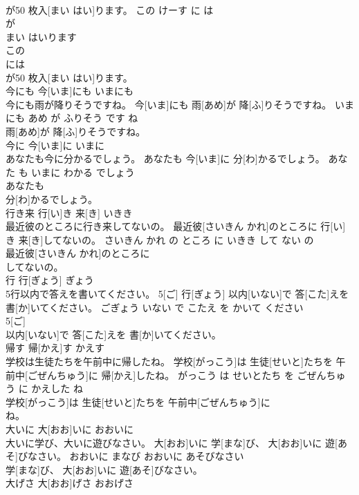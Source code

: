 \documentclass[8pt]{extreport}
\begin{document}
\begin{CJK}{UTF8}{min}
\\	が50 枚入[まい はい]ります。	この けーす に は 
\\	が 
\\	まい はいります	
\\	この
\\	には
\\	が50 枚入[まい はい]ります。			
\\	今にも	今[いま]にも	いまにも	
\\	今にも雨が降りそうですね。	今[いま]にも 雨[あめ]が 降[ふ]りそうですね。	いまにも あめ が ふりそう です ね	
\\	雨[あめ]が 降[ふ]りそうですね。			
\\	今に	今[いま]に	いまに	
\\	あなたも今に分かるでしょう。	あなたも 今[いま]に 分[わ]かるでしょう。	あなた も いまに わかる でしょう	
\\	あなたも
\\	分[わ]かるでしょう。			
\\	行き来	行[い]き 来[き]	いきき	
\\	最近彼のところに行き来してないの。	最近彼[さいきん かれ]のところに 行[い]き 来[き]してないの。	さいきん かれ の ところ に いきき して ない の	
\\	最近彼[さいきん かれ]のところに
\\	してないの。			
\\	行	行[ぎょう]	ぎょう	
\\	5行以内で答えを書いてください。	5[ご] 行[ぎょう] 以内[いない]で 答[こた]えを 書[か]いてください。	ごぎょう いない で こたえ を かいて ください	
\\	5[ご]
\\	以内[いない]で 答[こた]えを 書[か]いてください。			
\\	帰す	帰[かえ]す	かえす	
\\	学校は生徒たちを午前中に帰したね。	学校[がっこう]は 生徒[せいと]たちを 午前中[ごぜんちゅう]に 帰[かえ]したね。	がっこう は せいとたち を ごぜんちゅう に かえした ね	
\\	学校[がっこう]は 生徒[せいと]たちを 午前中[ごぜんちゅう]に
\\	ね。			
\\	大いに	大[おお]いに	おおいに	
\\	大いに学び、大いに遊びなさい。	大[おお]いに 学[まな]び、 大[おお]いに 遊[あそ]びなさい。	おおいに まなび おおいに あそびなさい	
\\	学[まな]び、 大[おお]いに 遊[あそ]びなさい。			
\\	大げさ	大[おお]げさ	おおげさ	

\end{CJK}
\end{document}
